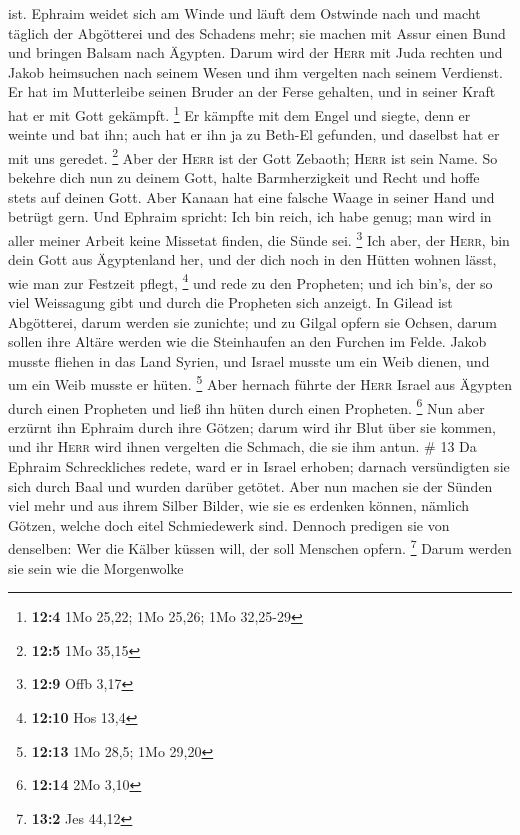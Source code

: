 ist.  Ephraim weidet sich am Winde und läuft dem Ostwinde
nach und macht täglich der Abgötterei und des Schadens mehr; sie machen
mit Assur einen Bund und bringen Balsam nach Ägypten. 
Darum wird der \textsc{Herr} mit Juda rechten und Jakob heimsuchen nach
seinem Wesen und ihm vergelten nach seinem Verdienst.  Er
hat im Mutterleibe seinen Bruder an der Ferse gehalten, und in seiner
Kraft hat er mit Gott gekämpft. \footnote{\textbf{12:4} 1Mo 25,22; 1Mo
  25,26; 1Mo 32,25-29}  Er kämpfte mit dem Engel und
siegte, denn er weinte und bat ihn; auch hat er ihn ja zu Beth-El
gefunden, und daselbst hat er mit uns geredet. \footnote{\textbf{12:5}
  1Mo 35,15}  Aber der \textsc{Herr} ist der Gott Zebaoth;
\textsc{Herr} ist sein Name.  So bekehre dich nun zu
deinem Gott, halte Barmherzigkeit und Recht und hoffe stets auf deinen
Gott.  Aber Kanaan hat eine falsche Waage in seiner Hand
und betrügt gern.  Und Ephraim spricht: Ich bin reich, ich
habe genug; man wird in aller meiner Arbeit keine Missetat finden, die
Sünde sei. \footnote{\textbf{12:9} Offb 3,17}  Ich aber,
der \textsc{Herr}, bin dein Gott aus Ägyptenland her, und der dich noch
in den Hütten wohnen lässt, wie man zur Festzeit pflegt, \footnote{\textbf{12:10}
  Hos 13,4}  und rede zu den Propheten; und ich bin's,
der so viel Weissagung gibt und durch die Propheten sich anzeigt.
 In Gilead ist Abgötterei, darum werden sie zunichte; und
zu Gilgal opfern sie Ochsen, darum sollen ihre Altäre werden wie die
Steinhaufen an den Furchen im Felde.  Jakob musste
fliehen in das Land Syrien, und Israel musste um ein Weib dienen, und um
ein Weib musste er hüten. \footnote{\textbf{12:13} 1Mo 28,5; 1Mo 29,20}
 Aber hernach führte der \textsc{Herr} Israel aus Ägypten
durch einen Propheten und ließ ihn hüten durch einen Propheten.
\footnote{\textbf{12:14} 2Mo 3,10}  Nun aber erzürnt ihn
Ephraim durch ihre Götzen; darum wird ihr Blut über sie kommen, und ihr
\textsc{Herr} wird ihnen vergelten die Schmach, die sie ihm antun. \# 13
 Da Ephraim Schreckliches redete, ward er in Israel
erhoben; darnach versündigten sie sich durch Baal und wurden darüber
getötet.  Aber nun machen sie der Sünden viel mehr und aus
ihrem Silber Bilder, wie sie es erdenken können, nämlich Götzen, welche
doch eitel Schmiedewerk sind. Dennoch predigen sie von denselben: Wer
die Kälber küssen will, der soll Menschen opfern. \footnote{\textbf{13:2}
  Jes 44,12}  Darum werden sie sein wie die Morgenwolke
